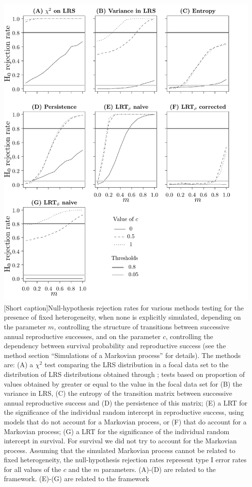\begin{center}
	\includegraphics[width=\textwidth]{FiguresDynHet/Figure3}
  [Short caption]{\footnotesize Null-hypothesis rejection rates for various methods testing for the presence of fixed heterogeneity, when none is explicitly simulated, depending on the parameter $m$, controlling the structure of transitions between successive annual reproductive successes, and on the parameter $c$, controlling the dependency between survival probability and reproductive success (see the method section ``Simulations of a Markovian process'' for details). The methods are: (A) a $\chi^2$ test comparing the LRS distribution in a focal data set to the distribution of LRS distributions obtained through \NSM; tests based on proportion of values obtained by \NSM greater or equal to the value in the focal data set for (B) the variance in LRS, (C) the entropy of the transition matrix between successive annual reproductive success and (D) the persistence of this matrix; (E) a LRT for the significance of the individual random intercept in reproductive success, using models that do not account for a Markovian process, or (F) that do account for a Markovian process; (G) a LRT for the significance of the individual random intercept in survival. For survival we did not try to account for the Markovian process. Assuming that the simulated Markovian process cannot be related to fixed heterogeneity, the null-hypothesis rejection rates represent type I error rates for all values of the $c$ and the $m$ parameters. (A)-(D) are related to the \NSM framework. (E)-(G) are related to the \MM framework}
	\label{figure:Markov}
\end{center}


